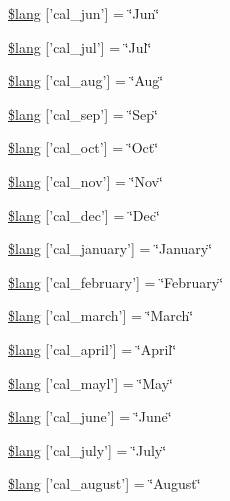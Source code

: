 \begin{DoxyCompactItemize}
\item 
\hyperlink{calendar__lang_8php_aabea2be5e0612f96b8d388183c4a3ebb}{\$lang} \mbox{[}'cal\-\_\-jun'\mbox{]} = \char`\"{}Jun\char`\"{}
\item 
\hyperlink{calendar__lang_8php_a65585e0f8fda86a900ced005f0bb3c16}{\$lang} \mbox{[}'cal\-\_\-jul'\mbox{]} = \char`\"{}Jul\char`\"{}
\item 
\hyperlink{calendar__lang_8php_ab7a387970f84455d8f289020761aeb83}{\$lang} \mbox{[}'cal\-\_\-aug'\mbox{]} = \char`\"{}Aug\char`\"{}
\item 
\hyperlink{calendar__lang_8php_a09ed21f8320998bf99f89cc5121a69b2}{\$lang} \mbox{[}'cal\-\_\-sep'\mbox{]} = \char`\"{}Sep\char`\"{}
\item 
\hyperlink{calendar__lang_8php_af4d1254dc312bf5e945d47d1011f35f7}{\$lang} \mbox{[}'cal\-\_\-oct'\mbox{]} = \char`\"{}Oct\char`\"{}
\item 
\hyperlink{calendar__lang_8php_a6c8f862507c12a677f22d9df6bf92515}{\$lang} \mbox{[}'cal\-\_\-nov'\mbox{]} = \char`\"{}Nov\char`\"{}
\item 
\hyperlink{calendar__lang_8php_ab97feaeee2a9c0746ca0a3631c6f70db}{\$lang} \mbox{[}'cal\-\_\-dec'\mbox{]} = \char`\"{}Dec\char`\"{}
\item 
\hyperlink{calendar__lang_8php_a8b4025982a3bddb1a5cfd4c37dd5e859}{\$lang} \mbox{[}'cal\-\_\-january'\mbox{]} = \char`\"{}January\char`\"{}
\item 
\hyperlink{calendar__lang_8php_a32a50b63add7abc253c9bc36f4fa6f72}{\$lang} \mbox{[}'cal\-\_\-february'\mbox{]} = \char`\"{}February\char`\"{}
\item 
\hyperlink{calendar__lang_8php_af69ae8067fe6af9913575c2338bdcb00}{\$lang} \mbox{[}'cal\-\_\-march'\mbox{]} = \char`\"{}March\char`\"{}
\item 
\hyperlink{calendar__lang_8php_a91b47019689ab8d459212335c8bb558f}{\$lang} \mbox{[}'cal\-\_\-april'\mbox{]} = \char`\"{}April\char`\"{}
\item 
\hyperlink{calendar__lang_8php_a000c61063bbbaeda4e1e0f81717cf6f2}{\$lang} \mbox{[}'cal\-\_\-mayl'\mbox{]} = \char`\"{}May\char`\"{}
\item 
\hyperlink{calendar__lang_8php_acf04877cbc6934c38186bfaad8f7c4f0}{\$lang} \mbox{[}'cal\-\_\-june'\mbox{]} = \char`\"{}June\char`\"{}
\item 
\hyperlink{calendar__lang_8php_a067d03b1260e590cabb18e68c08f3868}{\$lang} \mbox{[}'cal\-\_\-july'\mbox{]} = \char`\"{}July\char`\"{}
\item 
\hyperlink{calendar__lang_8php_a8e8cfd4eda2dda803f5c4f6cbbf2279f}{\$lang} \mbox{[}'cal\-\_\-august'\mbox{]} = \char`\"{}August\char`\"{}

\end{DoxyCompactItemize}
